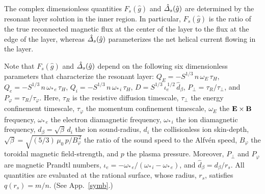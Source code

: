 \documentclass[12pt,prb,aps]{revtex4-1}
\begin{document}
The complex dimensionless quantities $F_s(\hat{g})$ and $\hat{\mit\Delta}_s(\hat{g})$ are determined by the resonant layer solution in the inner region. In particular,
$F_s(\hat{g})$ is the ratio of the true reconnected magnetic flux at the center of the layer to the flux at the edge of the layer,  whereas $\hat{\mit\Delta}_s(\hat{g})$ parameterizes the net helical current flowing in the  
layer. 

Note that $F_s(\hat{g})$ and $\hat{\mit\Delta}_s(\hat{g})$ depend on the following six
dimensionless  parameters that characterize the resonant layer: $Q_E= -S^{1/3}\,n\,\omega_E\,\tau_H$, $Q_e = -S^{1/3}\,n\,\omega_{\ast\,e}\,\tau_H$, $Q_i = -S^{1/3}\,n\,\omega_{\ast\,i}\,\tau_H$,
$D=S^{1/3}\,\iota_e^{\,1/2}\,\hat{d}_\beta$, $P_\perp=\tau_R/\tau_\perp$, and $P_\varphi= \tau_R/\tau_\varphi$. Here, $\tau_R$ is the resistive diffusion timescale, $\tau_\perp$ the energy confinement timescale,
$\tau_\varphi$ the momentum confinement timescale,  $\omega_E$ the ${\bf E}\times {\bf B}$ frequency, $\omega_{\ast\,e}$ the
electron diamagnetic frequency, $\omega_{\ast\,i}$ the ion diamagnetic frequency, $d_\beta=\sqrt{\beta}\,d_i$ the ion sound-radius, $d_i$ the collisionless ion skin-depth, 
$\sqrt{\beta}=\sqrt{(5/3)\,\mu_0\,p/B_\varphi^{\,2}}$ the ratio of the sound speed
to the Alfv\'{e}n speed,  $B_\varphi$ the toroidal magnetic field-strength, and $p$ the plasma pressure.   Moreover,
$P_\perp$ and $P_\varphi$ are magnetic Prandtl numbers, 
$\iota_e = - \omega_{\ast\,e}/(\omega_{\ast\,i}-\omega_{\ast\,e})$, and $\hat{d}_\beta= d_\beta/r_s$. All quantities are evaluated at the
rational surface, whose radius, $r_s$, satisfies $q(r_s)=m/n$. (See App.~\ref{symb}.)
\end{document}
